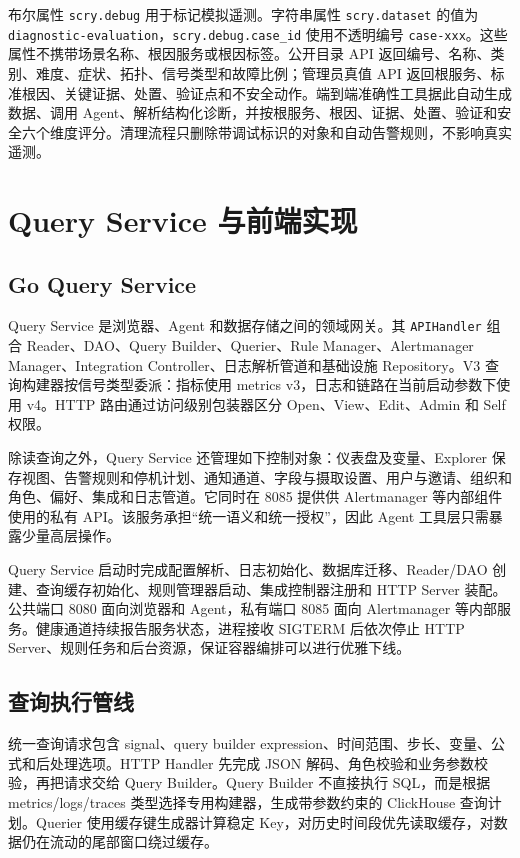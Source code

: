 \documentclass[conference,10pt]{IEEEtran}
\newcommand{\code}[1]{\texttt{#1}}
\begin{document}
布尔属性 \code{scry.debug} 用于标记模拟遥测。字符串属性 \code{scry.dataset} 的值为 \code{diagnostic-evaluation}，\code{scry.debug.case\_id} 使用不透明编号 \code{case-xxx}。这些属性不携带场景名称、根因服务或根因标签。公开目录 API 返回编号、名称、类别、难度、症状、拓扑、信号类型和故障比例；管理员真值 API 返回根服务、标准根因、关键证据、处置、验证点和不安全动作。端到端准确性工具据此自动生成数据、调用 Agent、解析结构化诊断，并按根服务、根因、证据、处置、验证和安全六个维度评分。清理流程只删除带调试标识的对象和自动告警规则，不影响真实遥测。

\section{Query Service 与前端实现}

\subsection{Go Query Service}

Query Service 是浏览器、Agent 和数据存储之间的领域网关。其 \code{APIHandler} 组合 Reader、DAO、Query Builder、Querier、Rule Manager、Alertmanager Manager、Integration Controller、日志解析管道和基础设施 Repository。V3 查询构建器按信号类型委派：指标使用 metrics v3，日志和链路在当前启动参数下使用 v4。HTTP 路由通过访问级别包装器区分 Open、View、Edit、Admin 和 Self 权限。

除读查询之外，Query Service 还管理如下控制对象：仪表盘及变量、Explorer 保存视图、告警规则和停机计划、通知通道、字段与摄取设置、用户与邀请、组织和角色、偏好、集成和日志管道。它同时在 8085 提供供 Alertmanager 等内部组件使用的私有 API。该服务承担“统一语义和统一授权”，因此 Agent 工具层只需暴露少量高层操作。

Query Service 启动时完成配置解析、日志初始化、数据库迁移、Reader/DAO 创建、查询缓存初始化、规则管理器启动、集成控制器注册和 HTTP Server 装配。公共端口 8080 面向浏览器和 Agent，私有端口 8085 面向 Alertmanager 等内部服务。健康通道持续报告服务状态，进程接收 SIGTERM 后依次停止 HTTP Server、规则任务和后台资源，保证容器编排可以进行优雅下线。

\subsection{查询执行管线}

统一查询请求包含 signal、query builder expression、时间范围、步长、变量、公式和后处理选项。HTTP Handler 先完成 JSON 解码、角色校验和业务参数校验，再把请求交给 Query Builder。Query Builder 不直接执行 SQL，而是根据 metrics/logs/traces 类型选择专用构建器，生成带参数约束的 ClickHouse 查询计划。Querier 使用缓存键生成器计算稳定 Key，对历史时间段优先读取缓存，对数据仍在流动的尾部窗口绕过缓存。
\end{document}
